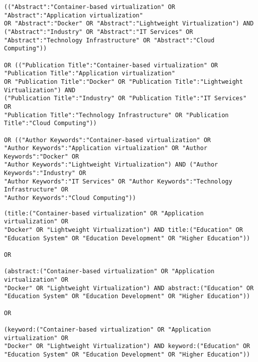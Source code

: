 \begin{tcolorbox}[
  colback=gray!5, 
  colframe=black!60, 
  title=Cadena de búsqueda en IEE para industria, 
  fonttitle=\bfseries, 
  sharp corners=south
]
\scriptsize %
\begin{verbatim}
(("Abstract":"Container-based virtualization" OR "Abstract":"Application virtualization" 
OR "Abstract":"Docker" OR "Abstract":"Lightweight Virtualization") AND 
("Abstract":"Industry" OR "Abstract":"IT Services" OR 
"Abstract":"Technology Infrastructure" OR "Abstract":"Cloud Computing")) 

OR (("Publication Title":"Container-based virtualization" OR 
"Publication Title":"Application virtualization" 
OR "Publication Title":"Docker" OR "Publication Title":"Lightweight Virtualization") AND 
("Publication Title":"Industry" OR "Publication Title":"IT Services" OR 
"Publication Title":"Technology Infrastructure" OR "Publication Title":"Cloud Computing"))

OR (("Author Keywords":"Container-based virtualization" OR 
"Author Keywords":"Application virtualization" OR "Author Keywords":"Docker" OR 
"Author Keywords":"Lightweight Virtualization") AND ("Author Keywords":"Industry" OR 
"Author Keywords":"IT Services" OR "Author Keywords":"Technology Infrastructure" OR 
"Author Keywords":"Cloud Computing"))
\end{verbatim}
\end{tcolorbox}

\begin{tcolorbox}[
  colback=gray!5, 
  colframe=black!60, 
  title=Cadena de búsqueda en Springer para educación, 
  fonttitle=\bfseries, 
  sharp corners=south
]
\scriptsize %
\begin{verbatim}
(title:("Container-based virtualization" OR "Application virtualization" OR 
"Docker" OR "Lightweight Virtualization") AND title:("Education" OR 
"Education System" OR "Education Development" OR "Higher Education"))

OR

(abstract:("Container-based virtualization" OR "Application virtualization" OR 
"Docker" OR "Lightweight Virtualization") AND abstract:("Education" OR 
"Education System" OR "Education Development" OR "Higher Education"))

OR 

(keyword:("Container-based virtualization" OR "Application virtualization" OR 
"Docker" OR "Lightweight Virtualization") AND keyword:("Education" OR 
"Education System" OR "Education Development" OR "Higher Education"))

\end{verbatim}
\end{tcolorbox}

